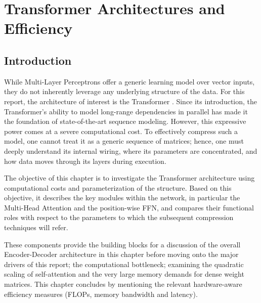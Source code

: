 \chapter{Transformer Architectures and Efficiency}
\label{chap:specialized_architectures}

\section{Introduction}
While Multi-Layer Perceptrons offer a generic learning model over vector inputs, they do not inherently leverage any underlying structure of the data. For this report, the architecture of interest is the Transformer \cite{vaswani2017attention}. Since its introduction, the Transformer’s ability to model long-range dependencies in parallel has made it the foundation of state-of-the-art sequence modeling. However, this expressive power comes at a severe computational cost. To effectively compress such a model, one cannot treat it as a generic sequence of matrices; hence, one must deeply understand its internal wiring, where its parameters are concentrated, and how data moves through its layers during execution.

The objective of this chapter is to investigate the Transformer architecture using computational costs and parameterization of the structure. Based on this objective, it describes the key modules within the network, in particular the Multi-Head Attention and the position-wise FFN, and compares their  functional roles with respect to the parameters to which the subsequent compression techniques will refer.

These components provide the building blocks for a discussion of the overall Encoder-Decoder architecture in this chapter before moving onto the major drivers of this report; the computational bottleneck; examining the quadratic scaling of self-attention and the very large memory demands for dense weight matrices. This chapter concludes by mentioning the relevant hardware-aware efficiency measures (FLOPs, memory bandwidth and latency).




